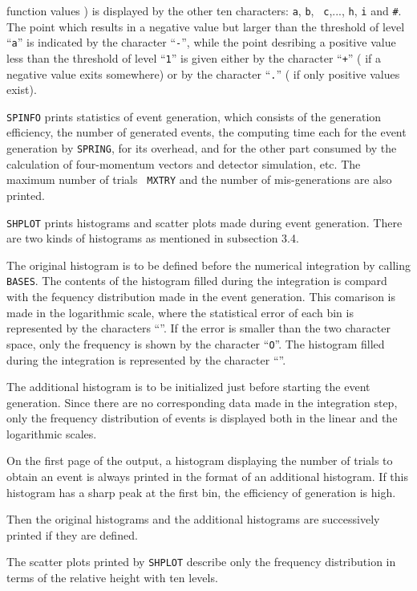 function values ) is displayed by the other ten characters: {\tt a}, {\tt b}, {\tt
c},..., {\tt h}, {\tt  i} and {\tt \#}. 
The point which results in a negative
value but larger than the threshold of level ``{\tt a}'' is indicated by the
character ``{\tt -}'', while the point desribing a positive value less than the
threshold of level ``{\tt 1}'' is given either by the character ``{\tt +}'' (
if a negative value exits somewhere) or by the character ``{\tt .}'' ( if only
 positive values exist).  
\par\smallskip
{}
\par\noindent
{\tt SPINFO} prints statistics of  event generation,
which consists of the generation efficiency, the number of generated events,
the computing time each for the event generation by {\tt SPRING}, for its
overhead, and for the other part consumed by the calculation of four-momentum
vectors and detector simulation, etc. 
The maximum number of trials {\tt
MXTRY} and the number of mis-generations are also printed.
\par\smallskip
{}
\par\noindent
{\tt SHPLOT} prints histograms and scatter plots made during event
generation.
There are two kinds of histograms as mentioned in subsection 3.4.
\par
The original histogram is to be defined before the numerical
integration by calling {\tt BASES}.
The contents of the histogram filled during the integration is
compard with the fequency distribution made in the event generation.
This comarison is made in the logarithmic scale, where the statistical error
of each bin is represented by the characters ``{\tt <  >}''.
If the error is smaller than the two character space, only the frequency is
shown by the character ``{\tt O}''.
The histogram filled during the integration is represented by the character
``{\tt *}''.
\par
The additional histogram is to be initialized just
before starting the event generation.
Since there are no corresponding data made in the integration 
step, only the frequency distribution of events is displayed both in the linear
 and the logarithmic scales.
\par
On the first page of the output, a histogram displaying the number of trials to
obtain an event is always printed in the format of an additional histogram.
If this histogram has a sharp peak at the first bin, the efficiency
of generation is high.
\par\noindent
 Then the original histograms and the additional
histograms are successively printed if they are defined.  
\par 
The scatter plots printed by {\tt SHPLOT}
describe only the frequency distribution in terms of the relative height with
ten levels.